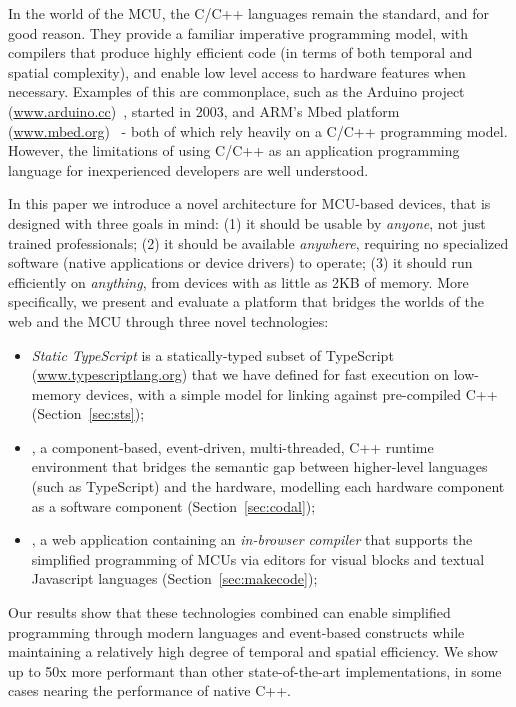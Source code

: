 In the world of the MCU, the C/C++ languages remain the standard, and for good reason.
They provide a familiar imperative programming model, with compilers that produce highly efficient code (in terms of both
temporal and spatial complexity), and enable low level access to hardware features when necessary. Examples
of this are commonplace, such as the Arduino project (\url{www.arduino.cc})~\cite{buildingArduino2014},
started in 2003, and ARM's Mbed platform (\url{www.mbed.org})~\cite{ARMmbed} - both of which rely heavily on
a C/C++ programming model. However, the limitations of using C/C++ as an application programming language for
inexperienced developers are well understood.

In this paper we introduce a novel architecture for MCU-based devices,
that is designed with three goals in mind:
(1) it should be usable by \emph{anyone}, not just trained professionals;
(2) it should be available \emph{anywhere}, requiring no specialized software (native applications
or device drivers) to operate;
(3) it should run efficiently on \emph{anything}, from devices with as little as 2KB of memory.
More specifically, we present and evaluate a platform that bridges the worlds of the web and the
MCU through three novel technologies:

\begin{itemize}
\item \emph{Static TypeScript} is a statically-typed subset of TypeScript
(\url{www.typescriptlang.org}) that we have defined for fast execution on low-memory devices,
with a simple model for linking against pre-compiled C++ (Section~\ref{sec:sts});

\item \emph{\CO}, a component-based, event-driven, multi-threaded, C++ runtime environment
that bridges the semantic gap between higher-level languages (such as TypeScript) and the hardware,
modelling each hardware component as a software component (Section~\ref{sec:codal});

\item \emph{\MCN}, a web application containing an \emph{in-browser compiler} that supports the
simplified programming of MCUs via editors for visual blocks and textual Javascript languages
(Section~\ref{sec:makecode});
\end{itemize}

Our results show that these technologies combined can enable simplified programming through modern
languages and event-based constructs while maintaining a relatively high degree of temporal and spatial efficiency.
We show up to 50x more performant than other state-of-the-art implementations,
in some cases nearing the performance of native C++.

